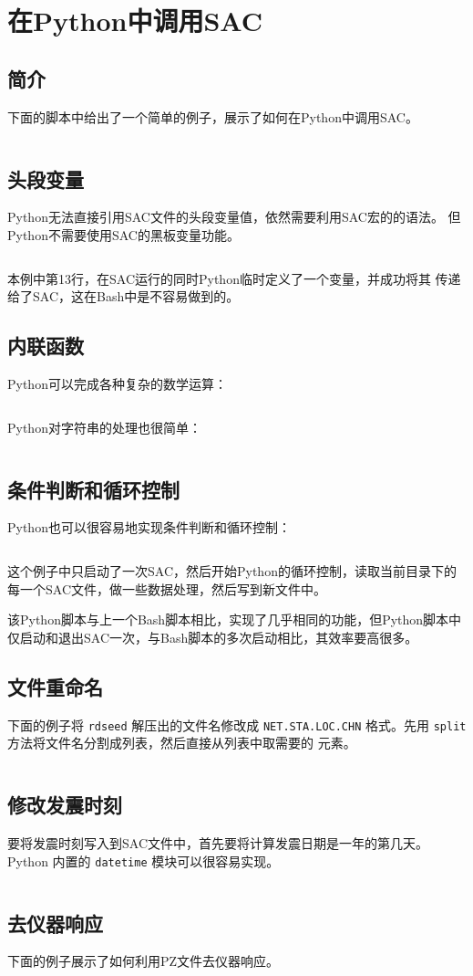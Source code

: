 \section{在Python中调用SAC}
\label{sec:sac-python}

\subsection{简介}
下面的脚本中给出了一个简单的例子，展示了如何在Python中调用SAC。
\inputminted{python}{./call-in-script/simple-script.py}

\subsection{头段变量}
Python无法直接引用SAC文件的头段变量值，依然需要利用SAC宏的的语法。
但Python不需要使用SAC的黑板变量功能。
\inputminted{python}{./call-in-script/variables.py}
本例中第13行，在SAC运行的同时Python临时定义了一个变量，并成功将其
传递给了SAC，这在Bash中是不容易做到的。

\subsection{内联函数}
Python可以完成各种复杂的数学运算：
\inputminted{python}{./call-in-script/arithmetic-functions.py}

Python对字符串的处理也很简单：
\inputminted{python}{./call-in-script/string-functions.py}

\subsection{条件判断和循环控制}
Python也可以很容易地实现条件判断和循环控制：
\inputminted{python}{./call-in-script/do-loops.py}
这个例子中只启动了一次SAC，然后开始Python的循环控制，读取当前目录下的
每一个SAC文件，做一些数据处理，然后写到新文件中。

该Python脚本与上一个Bash脚本相比，实现了几乎相同的功能，但Python脚本中
仅启动和退出SAC一次，与Bash脚本的多次启动相比，其效率要高很多。

\subsection{文件重命名}
\label{subsec:rename-in-python}
下面的例子将 \texttt{rdseed} 解压出的文件名修改成 \texttt{NET.STA.LOC.CHN}
格式。先用 \texttt{split} 方法将文件名分割成列表，然后直接从列表中取需要的
元素。
\inputminted{python}{./call-in-script/rename.py}

\subsection{修改发震时刻}
\label{subsec:ch-origin-python}
要将发震时刻写入到SAC文件中，首先要将计算发震日期是一年的第几天。Python
内置的 \texttt{datetime} 模块可以很容易实现。
\inputminted{python}{./call-in-script/ch-origin.py}

\subsection{去仪器响应}
下面的例子展示了如何利用PZ文件去仪器响应。
\inputminted{python}{./call-in-script/transfer.py}
